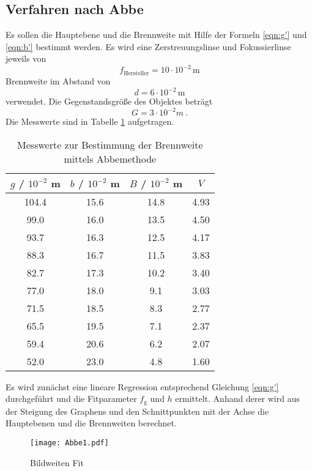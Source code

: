 \subsection{Verfahren nach Abbe}
Es sollen die Hauptebene und die Brennweite mit Hilfe der Formeln \eqref{eqn:g'} und \eqref{eqn:b'} bestimmt werden. Es wird eine Zerstreuungslinse und Fokussierlinse jeweils von 
\begin{equation}
  f_\text{Hersteller} = 10 \cdot 10^{-2} \, \text{m} 
\end{equation}
Brennweite im Abstand von
\begin{equation}
  d = 6 \cdot 10^{-2} \, \text{m}
  \label{eqn:d}
\end{equation}
verwendet. Die Gegenstandsgröße des Objektes beträgt
\begin{equation}
  G = 3 \cdot 10^{-2} m \ .
  \label{eqn:G}
\end{equation}
Die Messwerte sind in Tabelle \ref{tab:mabbe} aufgetragen.
\begin{table}
  \centering
  \begin{tabular}{c c c c}
    \toprule
    	$g$ / $10^{-2}$ m & $b$ / $10^{-2}$ m & $B$ / $10^{-2}$ m & $V$ \\
    \midrule
	104.4	& 15.6	& 14.8	& 4.93	\\
	99.0	& 16.0	& 13.5	& 4.50	\\
	93.7	& 16.3	& 12.5	& 4.17	\\
	88.3	& 16.7	& 11.5	& 3.83	\\
	82.7	& 17.3	& 10.2	& 3.40	\\
	77.0	& 18.0	& 9.1	& 3.03	\\
	71.5	& 18.5	& 8.3	& 2.77	\\
	65.5	& 19.5	& 7.1	& 2.37	\\
	59.4	& 20.6	& 6.2	& 2.07	\\
	52.0	& 23.0	& 4.8	& 1.60	\\
    \bottomrule
  \end{tabular}
  \caption{Messwerte zur Bestimmung der Brennweite mittels Abbemethode}
  \label{tab:mabbe}
\end{table}
Es wird zunächst eine lineare Regression entsprechend Gleichung \eqref{eqn:g'} durchgeführt und die Fitparameter $f_\text{g}$ und $h$ ermittelt. Anhand derer wird aus der Steigung des Graphens und den Schnittpunkten mit der Achse die Hauptebenen und die Brennweiten berechnet.
\begin{figure}
  \centering
    \texttt{[image: Abbe1.pdf]}
  \caption{Bildweiten Fit}
  \label{fig:Gfit}
\end{figure}
